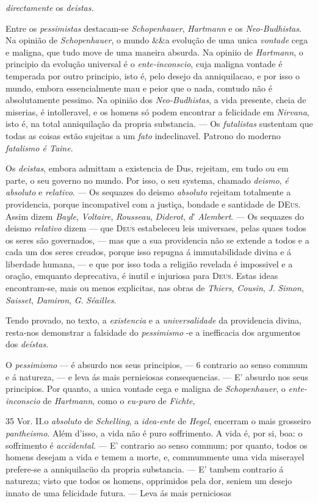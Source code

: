 \emph{directamente} os \emph{deistas}.\par Entre os \emph{pessimistas} destacam-se \emph{Schopenhauer}, \emph{Hartmann} e os \emph{Neo-Budhistas}. Na opinião de \emph{Schopenhauer}, o mundo \&\&a evolução de uma unica \emph{vontade} cega e maligna, que tudo move de uma maneira absurda. Na opiniio de \emph{Hartmann}, o principio da evolução universal é o \emph{ente-inconscio}, cuja maligna vontade é temperada por outro principio, isto é, pelo desejo da anniquilacao, e por isso o mundo, embora essencialmente mau e peior que o nada, comtudo não é absolutamente pessimo. Na opinião dos \emph{Neo-Budhistas}, a vida presente, cheia de miserias, é intolleravel, e os homens só podem encontrar a felicidade em \emph{Nirvana}, isto é, na total anniquilação da propria substancia. --- Os \emph{futalistas} sustentam que todas as coisas estão sujeitas a um \emph{fato} indeclinavel. Patrono do moderno \emph{fatalismo é Taine}.\par Os \emph{deistas}, embora admittam a existencia de Dus, rejeitam, em tudo ou em parte, o seu governo no mundo. Por isso, o seu systema, chamado \emph{deismo}, \emph{é absoluto} e \emph{relativo}. --- Os sequazes do deismo \emph{absoluto} rejeitam totalmente a providencia, porque incompativel com a justiça, bondade e santidade de \textsc{DEus}. Assim dizem \emph{Bayle}, \emph{Voltaire}, \emph{Rousseau}, \emph{Diderot}, \emph{d}' \emph{Alembert}. --- Os sequazes do deismo \emph{relativo} dizem --- que \textsc{Deus} estabeleceu leis universaes, pelas quaes todos os seres são governados, --- mas que a sua providencia não se extende a todos e a cada um dos seres creados, porque isso repugna á immutabilidade divina e á liberdade humana, --- e que por isso toda a religião revelada é impossivel e a oração, emquanto deprecativa, é inutil e injuriosa para \textsc{Deus}. Estas ideas encontram-se, mais ou menos explicitas, nas obras de \emph{Thiers}, \emph{Cousin}, \emph{J}. \emph{Simon}, \emph{Saisset}, \emph{Damiron}, \emph{G}. \emph{Séailles}.\par Tendo provado, no texto, a \emph{existencia} e a \emph{universalidade} da providencia divina, resta-nos demonstrar a falsidade do \emph{pessimismo} -e a inefficacia dos argumentos dos \emph{deístas}.\par O \emph{pessimismo} --- é absurdo nos seus principios, --- 6 contrario ao senso commum e á natureza, --- e leva ás mais pernieiosas consequencias. --- E' absurdo nos seus principios. Por quanto, a unica vontade cega e maligna de \emph{Schopenhauer}, o \emph{ente-inconscio} de \emph{Hartmann}, como o \emph{eu-puro} de \emph{Fichte},\par 35 Vor. II.o \emph{absoluto} de \emph{Schelling}, a \emph{idea-ente} de \emph{Hegel}, encerram o mais grosseiro \emph{pantheismo}. Além d'isso, a vida não é puro soffrimento. A vida é, por si, boa: o soffrimento é \emph{accidental}. --- E' contrario ao senso commum; por quanto, todos os homens desejam a vida e temem a morte, e, commummente uma vida miserayel prefere-se a anniquilacüo da propria substancia. --- E' tambem contrario á natureza; visto que todos os homens, opprimidos pela dor, seniem um desejo innato de uma felicidade futura. --- Leva ás mais perniciosas 